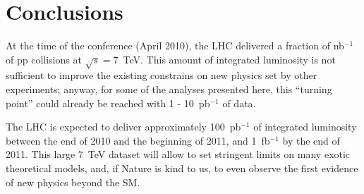 \documentclass{PoS}
\begin{document}
\section{Conclusions}
At the time of the conference (April 2010), the LHC delivered a fraction of nb$^{-1}$ 
of pp collisions at $\sqrt{s} = 7$~TeV. 
This amount of integrated luminosity is not  
sufficient to improve the existing constrains on new physics set by other experiments; 
anyway, for some of the analyses presented here, this ``turning point'' could 
already be reached with 1 - 10~pb$^{-1}$ of data.

The LHC is expected to deliver approximately 100~pb$^{-1}$ of integrated luminosity 
between the end of 2010 and the beginning of 2011, and 1~fb$^{-1}$ by the end of 2011. 
This large $7$~TeV dataset will allow to set stringent limits 
on many exotic theoretical models, and, if Nature is kind to us, 
to even observe the first evidence of new physics beyond the SM.
\end{document}
